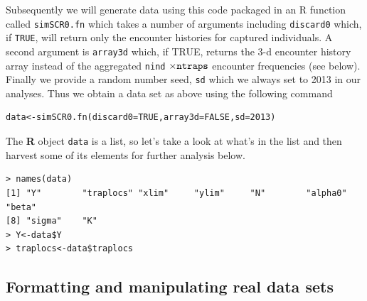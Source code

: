 Subsequently we will generate data using this code packaged in an R
function called \mbox{\tt simSCR0.fn} which takes a number of
arguments including \mbox{\tt discard0} which, if \mbox{\tt TRUE}, will return
only the encounter histories for captured individuals.  A second
argument is \mbox{\tt array3d} which, if TRUE, returns the 3-d
encounter history array instead of the aggregated \mbox{\tt nind}
$\times \mbox{\tt ntraps}$ encounter frequencies (see below). Finally
we provide a random number seed, \mbox{\tt sd} which we always set to
2013 in our analyses.  Thus we obtain a data set as above using the
following command
\begin{verbatim}
data<-simSCR0.fn(discard0=TRUE,array3d=FALSE,sd=2013)
\end{verbatim}
The {\bf R} object \mbox{\tt data} is a list, so let's take a look at what's in the list and then harvest some of its elements for further analysis below.
\begin{verbatim}
> names(data)
[1] "Y"        "traplocs" "xlim"     "ylim"     "N"        "alpha0"   "beta"  
[8] "sigma"    "K"       
> Y<-data$Y
> traplocs<-data$traplocs
\end{verbatim}


\subsection{Formatting and manipulating real data sets}

